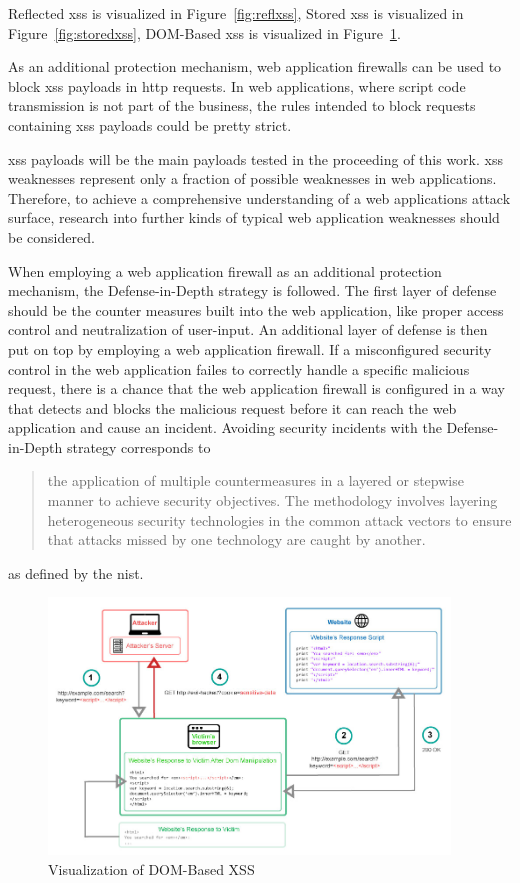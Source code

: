 Reflected \acrshort{xss} is visualized in Figure~\ref{fig:reflxss}, Stored \acrshort{xss} is visualized in Figure~\ref{fig:storedxss}, DOM-Based \acrshort{xss} is visualized in Figure~\ref{fig:domxss}.

As an additional protection mechanism, web application firewalls can be used to block \acrshort{xss} payloads in \acrshort{http} requests. In web applications, where script code transmission is not part of the business, the rules intended to block requests containing \acrshort{xss} payloads could be pretty strict.

\acrshort{xss} payloads will be the main payloads tested in the proceeding of this work.
\acrshort{xss} weaknesses represent only a fraction of possible weaknesses in web applications. Therefore, to achieve a comprehensive understanding of a web applications attack surface, research into further kinds of typical web application weaknesses should be considered.

When employing a web application firewall as an additional protection mechanism, the Defense-in-Depth strategy is followed.
The first layer of defense should be the counter measures built into the web application, like proper access control and neutralization of user-input.
An additional layer of defense is then put on top by employing a web application firewall.
If a misconfigured security control in the web application failes to correctly handle a specific malicious request, there is a chance that the web application firewall is configured in a way that detects and blocks the malicious request before it can reach the web application and cause an incident.
Avoiding security incidents with the Defense-in-Depth strategy corresponds to
\begin{quote}
	the application of multiple countermeasures in a layered or stepwise manner to achieve security objectives. The methodology involves layering heterogeneous security technologies in the common attack vectors to ensure that attacks missed by one technology are caught by another.
\end{quote}
as defined by the \acrfull{nist}. \cite{nist/did}

\begin{figure}
	\centering
		\includegraphics[width=0.95\textwidth]{domxss.jpg}
	\caption{Visualization of DOM-Based XSS \cite{cyberpunk/domxss}}
	\label{fig:domxss}
\end{figure}

